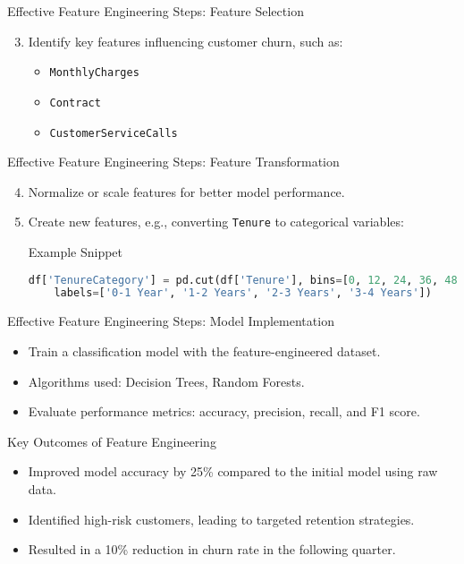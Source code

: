 \documentclass[aspectratio=169]{beamer}
\begin{document}
\begin{frame}{Effective Feature Engineering Steps: Feature Selection}
    \begin{enumerate}
        \setcounter{enumi}{2}
        \item Identify key features influencing customer churn, such as:
            \begin{itemize}
                \item \texttt{MonthlyCharges}
                \item \texttt{Contract}
                \item \texttt{CustomerServiceCalls}
            \end{itemize}
    \end{enumerate}
\end{frame}

\begin{frame}[fragile]{Effective Feature Engineering Steps: Feature Transformation}
    \begin{enumerate}
        \setcounter{enumi}{3}
        \item Normalize or scale features for better model performance.
        \item Create new features, e.g., converting \texttt{Tenure} to categorical variables:
        \begin{block}{Example Snippet}
            \begin{lstlisting}[language=Python]
df['TenureCategory'] = pd.cut(df['Tenure'], bins=[0, 12, 24, 36, 48],
    labels=['0-1 Year', '1-2 Years', '2-3 Years', '3-4 Years'])
            \end{lstlisting}
        \end{block}
    \end{enumerate}
\end{frame}

\begin{frame}{Effective Feature Engineering Steps: Model Implementation}
    \begin{itemize}
        \item Train a classification model with the feature-engineered dataset.
        \item Algorithms used: Decision Trees, Random Forests.
        \item Evaluate performance metrics: accuracy, precision, recall, and F1 score.
    \end{itemize}
\end{frame}

\begin{frame}{Key Outcomes of Feature Engineering}
    \begin{itemize}
        \item Improved model accuracy by 25\% compared to the initial model using raw data.
        \item Identified high-risk customers, leading to targeted retention strategies.
        \item Resulted in a 10\% reduction in churn rate in the following quarter.
    \end{itemize}
\end{frame}
\end{document}
